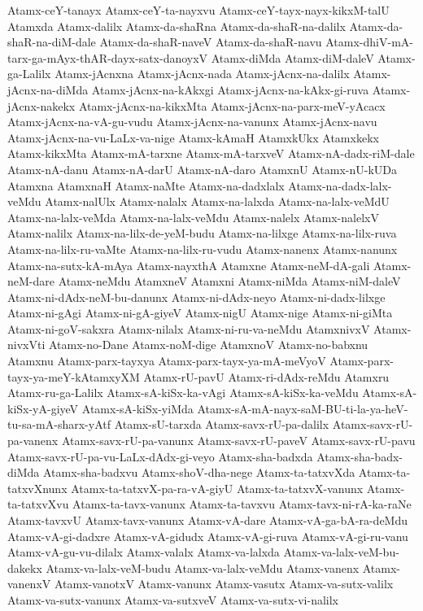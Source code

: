 {Atamx-ceY-tanayx
Atamx-ceY-ta-nayxvu
Atamx-ceY-tayx-nayx-kikxM-talU
Atamxda
Atamx-dalilx
Atamx-da-shaRna
Atamx-da-shaR-na-dalilx
Atamx-da-shaR-na-diM-dale
Atamx-da-shaR-naveV
Atamx-da-shaR-navu
Atamx-dhiV-mA-tarx-ga-mAyx-thAR-dayx-satx-danoyxV
Atamx-diMda
Atamx-diM-daleV
Atamx-ga-Lalilx
Atamx-jAcnxna
Atamx-jAcnx-nada
Atamx-jAcnx-na-dalilx
Atamx-jAcnx-na-diMda
Atamx-jAcnx-na-kAkxgi
Atamx-jAcnx-na-kAkx-gi-ruva
Atamx-jAcnx-nakekx
Atamx-jAcnx-na-kikxMta
Atamx-jAcnx-na-parx-meV-yAcacx
Atamx-jAcnx-na-vA-gu-vudu
Atamx-jAcnx-na-vanunx
Atamx-jAcnx-navu
Atamx-jAcnx-na-vu-LaLx-va-nige
Atamx-kAmaH
AtamxkUkx
Atamxkekx
Atamx-kikxMta
Atamx-mA-tarxne
Atamx-mA-tarxveV
Atamx-nA-dadx-riM-dale
Atamx-nA-danu
Atamx-nA-darU
Atamx-nA-daro
AtamxnU
Atamx-nU-kUDa
Atamxna
AtamxnaH
Atamx-naMte
Atamx-na-dadxlalx
Atamx-na-dadx-lalx-veMdu
Atamx-nalUlx
Atamx-nalalx
Atamx-na-lalxda
Atamx-na-lalx-veMdU
Atamx-na-lalx-veMda
Atamx-na-lalx-veMdu
Atamx-nalelx
Atamx-nalelxV
Atamx-nalilx
Atamx-na-lilx-de-yeM-budu
Atamx-na-lilxge
Atamx-na-lilx-ruva
Atamx-na-lilx-ru-vaMte
Atamx-na-lilx-ru-vudu
Atamx-nanenx
Atamx-nanunx
Atamx-na-sutx-kA-mAya
Atamx-nayxthA
Atamxne
Atamx-neM-dA-gali
Atamx-neM-dare
Atamx-neMdu
AtamxneV
Atamxni
Atamx-niMda
Atamx-niM-daleV
Atamx-ni-dAdx-neM-bu-danunx
Atamx-ni-dAdx-neyo
Atamx-ni-dadx-lilxge
Atamx-ni-gAgi
Atamx-ni-gA-giyeV
Atamx-nigU
Atamx-nige
Atamx-ni-giMta
Atamx-ni-goV-sakxra
Atamx-nilalx
Atamx-ni-ru-va-neMdu
AtamxnivxV
Atamx-nivxVti
Atamx-no-Dane
Atamx-noM-dige
AtamxnoV
Atamx-no-babxnu
Atamxnu
Atamx-parx-tayxya
Atamx-parx-tayx-ya-mA-meVyoV
Atamx-parx-tayx-ya-meY-kAtamxyXM
Atamx-rU-pavU
Atamx-ri-dAdx-reMdu
Atamxru
Atamx-ru-ga-Lalilx
Atamx-sA-kiSx-ka-vAgi
Atamx-sA-kiSx-ka-veMdu
Atamx-sA-kiSx-yA-giyeV
Atamx-sA-kiSx-yiMda
Atamx-sA-mA-nayx-saM-BU-ti-la-ya-heV-tu-sa-mA-sharx-yAtf
Atamx-sU-tarxda
Atamx-savx-rU-pa-dalilx
Atamx-savx-rU-pa-vanenx
Atamx-savx-rU-pa-vanunx
Atamx-savx-rU-paveV
Atamx-savx-rU-pavu
Atamx-savx-rU-pa-vu-LaLx-dAdx-gi-veyo
Atamx-sha-badxda
Atamx-sha-badx-diMda
Atamx-sha-badxvu
Atamx-shoV-dha-nege
Atamx-ta-tatxvXda
Atamx-ta-tatxvXnunx
Atamx-ta-tatxvX-pa-ra-vA-giyU
Atamx-ta-tatxvX-vanunx
Atamx-ta-tatxvXvu
Atamx-ta-tavx-vanunx
Atamx-ta-tavxvu
Atamx-tavx-ni-rA-ka-raNe
Atamx-tavxvU
Atamx-tavx-vanunx
Atamx-vA-dare
Atamx-vA-ga-bA-ra-deMdu
Atamx-vA-gi-dadxre
Atamx-vA-gidudx
Atamx-vA-gi-ruva
Atamx-vA-gi-ru-vanu
Atamx-vA-gu-vu-dilalx
Atamx-valalx
Atamx-va-lalxda
Atamx-va-lalx-veM-bu-dakekx
Atamx-va-lalx-veM-budu
Atamx-va-lalx-veMdu
Atamx-vanenx
Atamx-vanenxV
Atamx-vanotxV
Atamx-vanunx
Atamx-vasutx
Atamx-va-sutx-valilx
Atamx-va-sutx-vanunx
Atamx-va-sutxveV
Atamx-va-sutx-vi-nalilx
}
